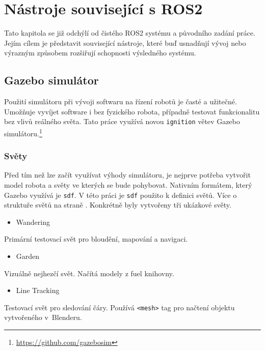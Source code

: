 \chapter{Nástroje související s ROS2}
Tato kapitola se již odchýlí od čistého ROS2 systému a původního zadání práce. Jejím cílem je představit související nástroje, které buď usnadňují vývoj nebo výrazným způsobem rozšiřují schopnosti výsledného systému.

\section{Gazebo simulátor}
Použití simulátoru při vývoji softwaru na řízení robotů je časté a užitečné. Umožňuje vyvíjet software i bez fyzického robota, případně testovat funkcionalitu bez vlivů reálného světa. Tato práce využívá novou \verb|ignition| větev Gazebo simulátoru.\footnote{\url{https://github.com/gazebosim}}

\subsection*{Světy}
Před tím než lze začít využívat výhody simulátoru, je nejprve potřeba vytvořit model robota a světy ve kterých se bude pohybovat. Nativním formátem, který Gazebo využívá je \verb|sdf|. V této práci je \verb|sdf| použito k definici světů. Více o struktuře světů na straně \pageref{theory:gazebo}. Konkrétně byly vytvořeny tři ukázkové světy.

\begin{itemize}[leftmargin=*]
	\item{Wandering}
\end{itemize}
\vspace*{-0.5em}
Primární testovací svět pro bloudění, mapování a navigaci.

\begin{itemize}[leftmargin=*]
	\item{Garden}
\end{itemize}
\vspace*{-0.5em}
Vizuálně nejhezčí svět. Načítá modely z fuel knihovny.

\begin{itemize}[leftmargin=*]
	\item{Line Tracking}
\end{itemize}
\vspace*{-0.5em}
Testovací svět pro sledování čáry. Používá \verb|<mesh>| tag pro načtení objektu vytvořeného v~Blenderu.

